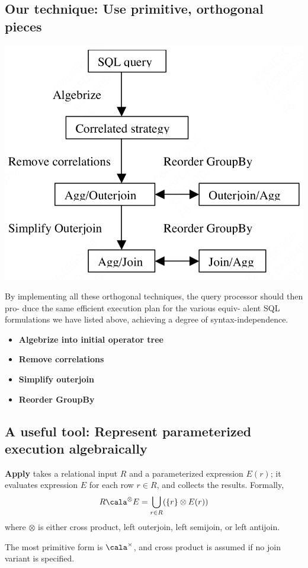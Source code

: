 \documentclass[11pt]{article}
\begin{document}
\subsection{Our technique: Use primitive, orthogonal pieces}
\label{sec:orgbaf466f}
\begin{center}
\includegraphics[width=.5\textwidth]{../../images/papers/95.png}
\end{center}

By implementing all these orthogonal techniques, the query processor should then pro- duce the same
efficient execution plan for the various equiv- alent SQL formulations we have listed above, achieving
a degree of syntax-independence.

\begin{itemize}
\item \textbf{Algebrize into initial operator tree}
\item \textbf{Remove correlations}
\item \textbf{Simplify outerjoin}
\item \textbf{Reorder GroupBy}
\end{itemize}
\subsection{A useful tool: Represent parameterized execution algebraically}
\label{sec:org4d25325}
\textbf{Apply} takes a relational input \(R\) and a parameterized expression \(E(r)\); it evaluates expression
\(E\) for each row \(r\in R\), and collects the results. Formally,
\begin{equation*}
R\cala^{\otimes}E=\bigcup_{r\in R}(\{r\}\otimes E(r))
\end{equation*}
where \(\otimes\) is either cross product, left outerjoin, left semijoin, or left antijoin.

The most primitive form is \(\cala^\times\), and cross product is assumed if no join variant is
specified.
\end{document}
